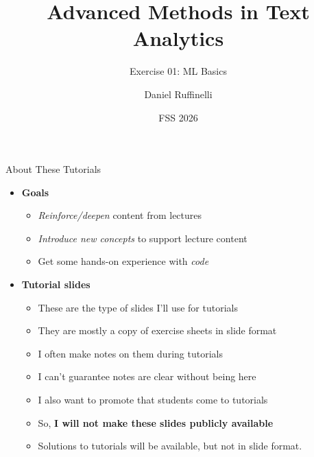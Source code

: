 \documentclass[t]{beamer}
\title[Write your short title here]{Advanced Methods in Text Analytics}
\subtitle{Exercise 01: ML Basics}
\author{Daniel Ruffinelli}
\institute{University of Mannheim}
\date{FSS 2026}
\begin{document}

\begin{frame}
    \titlepage{}
\end{frame}

\begin{frame}{About These Tutorials}{}
    \begin{itemize}
        \item \textbf{Goals}
              \begin{itemize}
                  \item \emph{Reinforce/deepen} content from lectures
                  \item \emph{Introduce new concepts} to support lecture content
                  \item Get some hands-on experience with \emph{code}
              \end{itemize}
        \item \textbf{Tutorial slides}
              \begin{itemize}
                  \item These are the type of slides I'll use for tutorials
                  \item They are mostly a copy of exercise sheets in slide
                        format
                  \item I often make notes on them during tutorials
                  \item I can't guarantee notes are clear without being here
                  \item I also want to promote that students come to tutorials
                  \item So, \textbf{I will not make these slides publicly
                            available}
                  \item Solutions to tutorials will be available, but not in
                        slide format.
              \end{itemize}
    \end{itemize}
\end{frame}
\end{document}
